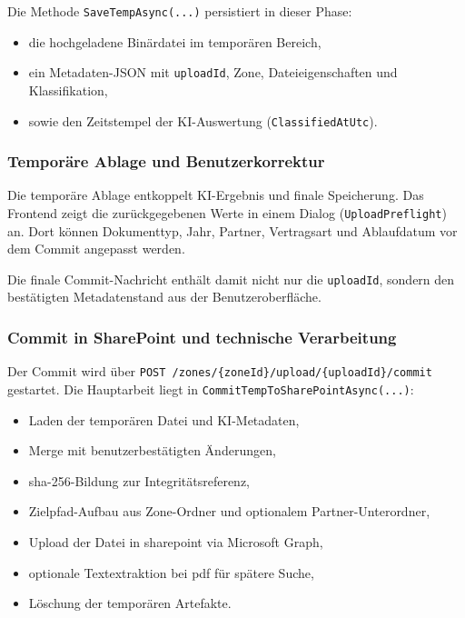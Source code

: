 Die Methode \texttt{SaveTempAsync(...)} persistiert in dieser Phase:
\begin{itemize}
    \item die hochgeladene Binärdatei im temporären Bereich,
    \item ein Metadaten-JSON mit \texttt{uploadId}, Zone, Dateieigenschaften und Klassifikation,
    \item sowie den Zeitstempel der KI-Auswertung (\texttt{ClassifiedAtUtc}).
\end{itemize}

\subsubsection{Temporäre Ablage und Benutzerkorrektur}

Die temporäre Ablage entkoppelt KI-Ergebnis und finale Speicherung. Das Frontend zeigt die zurückgegebenen Werte in einem Dialog (\texttt{UploadPreflight}) an. Dort können Dokumenttyp, Jahr, Partner, Vertragsart und Ablaufdatum vor dem Commit angepasst werden.

Die finale Commit-Nachricht enthält damit nicht nur die \texttt{uploadId}, sondern den bestätigten Metadatenstand aus der Benutzeroberfläche.

\subsubsection{Commit in SharePoint und technische Verarbeitung}

Der Commit wird über \texttt{POST /zones/\{zoneId\}/upload/\{uploadId\}/commit} gestartet. Die Hauptarbeit liegt in \texttt{CommitTempToSharePointAsync(...)}:
\begin{itemize}
    \item Laden der temporären Datei und KI-Metadaten,
    \item Merge mit benutzerbestätigten Änderungen,
    \item \acrshort{sha}-256-Bildung zur Integritätsreferenz,
    \item Zielpfad-Aufbau aus Zone-Ordner und optionalem Partner-Unterordner,
    \item Upload der Datei in \gls{sharepoint} via Microsoft Graph,
    \item optionale Textextraktion bei \acrshort{pdf} für spätere Suche,
    \item Löschung der temporären Artefakte.
\end{itemize}

